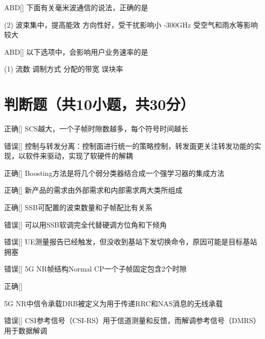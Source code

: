 \begin{choice}{\;ABD\;}[]
	下面有关毫米波通信的说法，正确的是
	\begin{tasks}(2)
		\task 波束集中，提高能效
		\task 方向性好，受干扰影响小
		-300GHz
		\task 受空气和雨水等影响较大
	\end{tasks}
\end{choice}

\begin{choice}{\;ABD\;}[]
	以下选项中，会影响用户业务速率的是
	\begin{tasks}(1)
		\task 流数
		\task 调制方式
		\task 分配的带宽
		\task 误块率
	\end{tasks}
\end{choice}




\section{判断题（共10小题，共30分）}

\begin{choice}{\;正确\;}[]
	SCS越大，一个子帧时隙数越多，每个符号时间越长
\end{choice}


\begin{choice}{\;错误\;}[]
	控制与转发分离：控制面进行统一的策略控制，转发面更关注转发功能的实现，以软件来驱动，实现了软硬件的解耦
\end{choice}

\begin{choice}{\;正确\;}[]
	Boosting方法是将几个弱分类器结合成一个强学习器的集成方法
\end{choice}

\begin{choice}{\;正确\;}[]
	新产品的需求由外部需求和内部需求两大类所组成
\end{choice}

\begin{choice}{\;正确\;}[]
	SSB可配置的波束数量和子帧配比有关系
\end{choice}

\begin{choice}{\;错误\;}[]
	可以用SSB软调完全代替硬调方位角和下倾角

\end{choice}


\begin{choice}{\;错误\;}[]
	UE测量报告已经触发，但没收到基站下发切换命令，原因可能是目标基站拥塞

\end{choice}

\begin{choice}{\;错误\;}[]
	5G NR帧结构Normal CP一个子帧固定包含2个时隙

\end{choice}

\begin{choice}{\;正确\;}[]

	5G NR中信令承载DRB被定义为用于传递RRC和NAS消息的无线承载
\end{choice}


\begin{choice}{\;错误\;}[]
	CSI参考信号（CSI-RS）用于信道测量和反馈，而解调参考信号（DMRS）用于数据解调

\end{choice}











